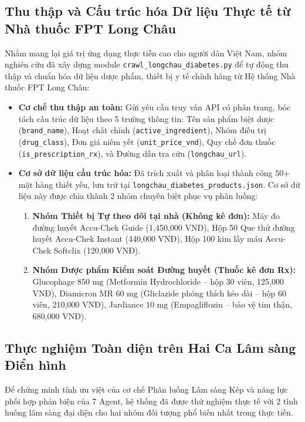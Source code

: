 \documentclass[12pt,a4paper]{article}
\begin{document}
\subsection{Thu thập và Cấu trúc hóa Dữ liệu Thực tế từ Nhà thuốc FPT Long Châu}

Nhằm mang lại giá trị ứng dụng thực tiễn cao cho người dân Việt Nam, nhóm nghiên cứu đã xây dựng module \texttt{crawl\_longchau\_diabetes.py} để tự động thu thập và chuẩn hóa dữ liệu dược phẩm, thiết bị y tế chính hãng từ Hệ thống Nhà thuốc FPT Long Châu:
\begin{itemize}[leftmargin=1.2cm]
    \item \textbf{Cơ chế thu thập an toàn:} Gửi yêu cầu truy vấn API có phân trang, bóc tách cấu trúc dữ liệu theo 5 trường thông tin: Tên sản phẩm biệt dược (\texttt{brand\_name}), Hoạt chất chính (\texttt{active\_ingredient}), Nhóm điều trị (\texttt{drug\_class}), Đơn giá niêm yết (\texttt{unit\_price\_vnd}), Quy chế đơn thuốc (\texttt{is\_prescription\_rx}), và Đường dẫn tra cứu (\texttt{longchau\_url}).
    \item \textbf{Cơ sở dữ liệu cấu trúc hóa:} Đã trích xuất và phân loại thành công 50+ mặt hàng thiết yếu, lưu trữ tại \texttt{longchau\_diabetes\_products.json}. Cơ sở dữ liệu này được chia thành 2 nhóm chuyên biệt phục vụ phân luồng:
    \begin{enumerate}[leftmargin=0.8cm]
        \item \textbf{Nhóm Thiết bị Tự theo dõi tại nhà (Không kê đơn):} Máy đo đường huyết Accu-Chek Guide (1,450,000 VNĐ), Hộp 50 Que thử đường huyết Accu-Chek Instant (440,000 VNĐ), Hộp 100 kim lấy máu Accu-Chek Softclix (120,000 VNĐ).
        \item \textbf{Nhóm Dược phẩm Kiểm soát Đường huyết (Thuốc kê đơn Rx):} Glucophage $850\text{ mg}$ (Metformin Hydrochloride -- hộp 30 viên, 125,000 VNĐ), Diamicron MR $60\text{ mg}$ (Gliclazide phóng thích kéo dài -- hộp 60 viên, 210,000 VNĐ), Jardiance $10\text{ mg}$ (Empagliflozin -- bảo vệ tim thận, 680,000 VNĐ).
    \end{enumerate}
\end{itemize}

\subsection{Thực nghiệm Toàn diện trên Hai Ca Lâm sàng Điển hình}

Để chứng minh tính ưu việt của cơ chế Phân luồng Lâm sàng Kép và năng lực phối hợp phản biện của 7 Agent, hệ thống đã được thử nghiệm thực tế với 2 tình huống lâm sàng đại diện cho hai nhóm đối tượng phổ biến nhất trong thực tiễn.
\end{document}
